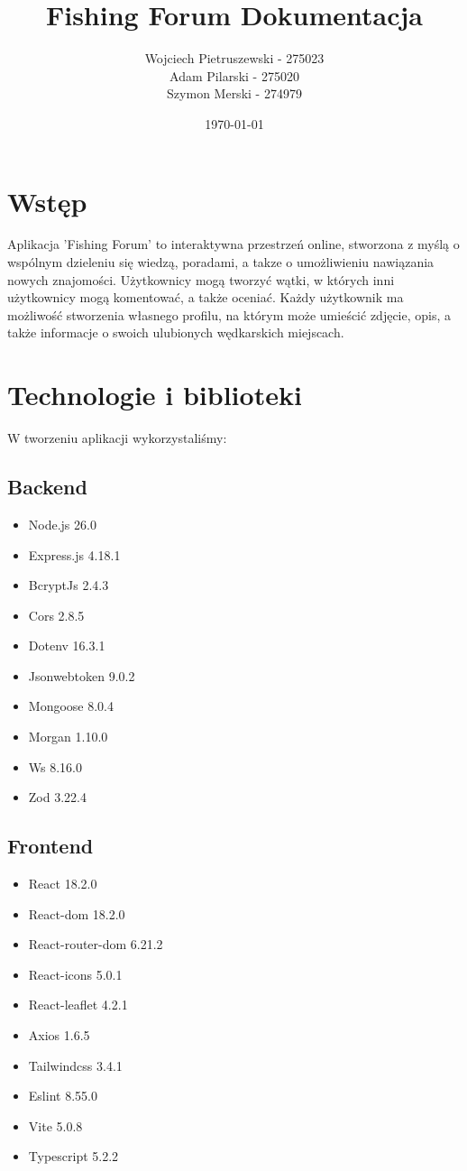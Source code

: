 \documentclass{article}
\begin{document}
\title{Fishing Forum Dokumentacja}
\author{
  Wojciech Pietruszewski - 275023 \\
  Adam Pilarski - 275020 \\
  Szymon Merski - 274979}
\date{\today}

\maketitle
\newpage
\tableofcontents

\newpage
\section{Wstęp}
Aplikacja 'Fishing Forum' to interaktywna przestrzeń online, stworzona z myślą o wspólnym dzieleniu się wiedzą, poradami, a takze o umożliwieniu nawiązania nowych znajomości. Użytkownicy mogą tworzyć wątki, w których inni użytkownicy mogą komentować, a także oceniać. Każdy użytkownik ma możliwość stworzenia własnego profilu, na którym może umieścić zdjęcie, opis, a także informacje o swoich ulubionych wędkarskich miejscach.

\section{Technologie i biblioteki}
W tworzeniu aplikacji wykorzystaliśmy:
\subsection{Backend}
\begin{itemize}
  \item Node.js 26.0
  \item Express.js 4.18.1
  \item BcryptJs 2.4.3
  \item Cors 2.8.5
  \item Dotenv 16.3.1
  \item Jsonwebtoken 9.0.2
  \item Mongoose 8.0.4
  \item Morgan 1.10.0
  \item Ws 8.16.0
  \item Zod 3.22.4
\end{itemize}
\subsection{Frontend}
\begin{itemize}
  \item React 18.2.0
  \item React-dom 18.2.0
  \item React-router-dom 6.21.2
  \item React-icons 5.0.1
  \item React-leaflet 4.2.1
  \item Axios 1.6.5
  \item Tailwindcss 3.4.1
  \item Eslint 8.55.0
  \item Vite 5.0.8
  \item Typescript 5.2.2
\end{itemize}
\end{document}
